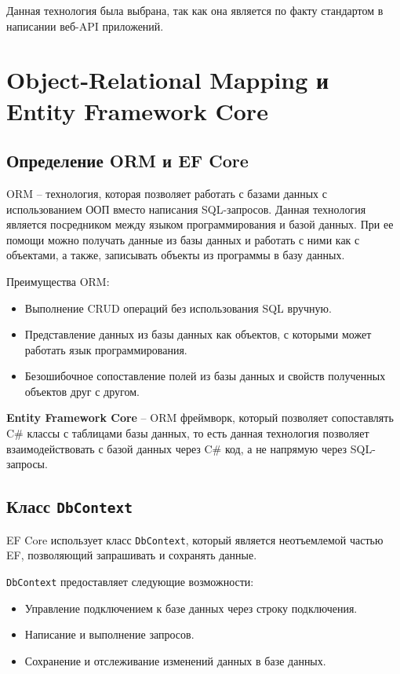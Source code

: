 \documentclass[a4paper,12pt]{report}
\begin{document}
Данная технология была выбрана, так как она является по факту стандартом в написании веб-\acs{API} приложений.

\section{Object-Relational Mapping и Entity Framework Core}

\subsection{Определение \acs{ORM} и \acs{EF} Core}

\acs{ORM} -- технология, которая позволяет работать с базами данных с использованием \acs{ООП} вместо написания \acs{SQL}-запросов. 
Данная технология является посредником между языком программирования и базой данных. 
При ее помощи можно получать данные из базы данных и работать с ними как с объектами, 
а также, записывать объекты из программы в базу данных.\cite{orm}

Преимущества \acs{ORM}:
\begin{itemize}
    \item
        Выполнение \acs{CRUD} операций без использования \acs{SQL} вручную.
    \item
        Представление данных из базы данных как объектов, с которыми может работать язык программирования.
    \item
        Безошибочное сопоставление полей из базы данных и свойств полученных объектов друг с другом.
\end{itemize}

\textbf{Entity Framework Core} -- \acs{ORM} фреймворк, который позволяет сопоставлять C\# классы с таблицами базы данных, 
то есть данная технология позволяет взаимодействовать с базой данных через C\# код, а не напрямую через \acs{SQL}-запросы.\cite{ef_core}


\subsection{Класс \texttt{DbContext}}

\acs{EF} Core использует класс \texttt{DbContext}, который является неотъемлемой частью \acs{EF}, позволяющий запрашивать и сохранять данные. 

\texttt{DbContext} предоставляет следующие возможности:
\begin{itemize}
    \item
        Управление подключением к базе данных через строку подключения.
    \item 
        Написание и выполнение запросов.
    \item
        Сохранение и отслеживание изменений данных в базе данных.
\end{itemize}
\end{document}

